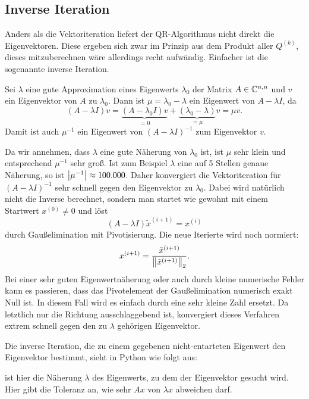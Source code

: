 \subsection{Inverse Iteration}

Anders als die Vektoriteration liefert der QR-Algorithmus nicht direkt die Eigenvektoren. Diese ergeben sich zwar im Prinzip aus dem Produkt aller $Q^{(k)}$, dieses mitzuberechnen wäre allerdings recht aufwändig. Einfacher ist die sogenannte inverse Iteration.

Sei $\lambda$ eine gute Approximation eines Eigenwerts
$\lambda_0$ der Matrix $A\in\mathbb{C}^{n,n}$ und $v$ ein Eigenvektor von $A$ zu $\lambda_0$. Dann ist $\mu = \lambda_0 -\lambda$ ein Eigenwert von $A-\lambda I$, da
\begin{equation}
  (A - \lambda I)v = \underbrace{(A - \lambda_0 I)v}_{=0} + \underbrace{(\lambda_0 -\lambda)}_{=\mu} v = \mu v.
\end{equation}
Damit ist auch $\mu^{-1}$ ein Eigenwert von $(A-\lambda I)^{-1}$ zum Eigenvektor $v$.

Da wir annehmen, dass $\lambda$ eine gute Näherung von $\lambda_0$ ist, ist $\mu$ sehr klein und entsprechend $\mu^{-1}$ sehr groß. Ist zum Beispiel $\lambda$ eine auf 5 Stellen genaue
Näherung, so ist $\left\lvert{\mu^{-1}}\right\rvert\approx 100.000$. Daher konvergiert die Vektoriteration für
$(A-\lambda I)^{-1}$ sehr schnell gegen den Eigenvektor zu $\lambda_0$. Dabei wird natürlich nicht die Inverse berechnet, sondern man startet wie gewohnt mit einem Startwert
$x^{(0)}\neq 0$ und löst
\begin{equation}
  (A - \lambda I) \tilde{x}^{(i+1)} = x^{(i)}
\end{equation}
durch Gaußelimination mit Pivotisierung. Die neue Iterierte wird noch
normiert:
\begin{equation}
  x^{(i+1)} = \frac{\tilde{x}^{(i+1)}}{\left\lVert{\tilde{x}^{(i+1)}}\right\rVert_2}.
\end{equation}
Bei einer sehr guten Eigenwertnäherung oder auch durch kleine
numerische Fehler kann es passieren, dass das Pivotelement der
Gaußelimination numerisch exakt Null ist. In diesem Fall wird es
einfach durch eine sehr kleine Zahl ersetzt. Da letztlich nur die
Richtung ausschlaggebend ist, konvergiert dieses Verfahren extrem
schnell gegen den zu $\lambda$ gehörigen Eigenvektor.

Die inverse Iteration, die zu einem gegebenen nicht-entarteten Eigenwert den Eigenvektor bestimmt, sieht in Python wie folgt aus:

 ist hier die Näherung $\lambda$ des Eigenwerts, zu dem der Eigenvektor gesucht wird. Hier gibt die Toleranz an, wie sehr $Ax$ von $\lambda x$ abweichen darf.

